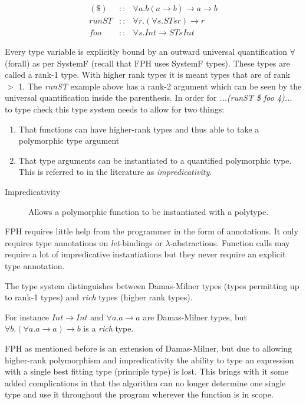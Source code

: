 \documentclass[twoside, titlepage, openright, a4paper]{book}
\begin{document}
\begin{eqnarray*}
(\$)  &::& \forall a. b (a\rightarrow b) \rightarrow a \rightarrow b\\
runST &::& \forall r. (\forall s. ST s r) \rightarrow r\\
foo   &::& \forall s. Int \rightarrow ST s Int
\end{eqnarray*}

Every type variable is explicitly bound by an outward universal quantification $\forall$ (forall) as per SystemF (recall that FPH uses SystemF types). These types are called a rank-1 type. With higher rank types it is meant types that are of rank $>$ 1.
The \textit{runST} example above has a rank-2 argument which can be seen by the universal quantification inside the parenthesis.
In order for \textit{...(runST \$ foo 4)...} to type check this type system needs to allow for two things:
\begin{enumerate}
\item That functions can have higher-rank types and thus able to take a polymorphic type argument
\item That type arguments can be instantiated to a quantified polymorphic type. This is referred to in the literature as \textit{impredicativity}.
\end{enumerate}

\begin{description}
\item[Impredicativity] Allows a polymorphic function to be instantiated with a polytype. 
\end{description}

FPH requires little help from the programmer in the form of annotations. It only requires type annotations on \textit{let}-bindings or $\lambda$-abstractions. Function calls may require a lot of impredicative instantiations but they never require an explicit type annotation.

The type system distinguishes between Damas-Milner types (types permitting up to rank-1 types) and \textit{rich} types (higher rank types).

For instance $Int \rightarrow Int$ and $\forall a. a \rightarrow a$ are Damas-Milner types, but $\forall b.(\forall a. a \rightarrow a) \rightarrow b$ is a \textit{rich} type.

FPH as mentioned before is an extension of Damas-Milner, but due to allowing higher-rank polymorphism and impredicativity the ability to type an expression with a single best fitting type (principle type) is lost. This brings with it some added complications in that the algorithm can no longer determine one single type and use it throughout the program wherever the function is in scope.
\end{document}
